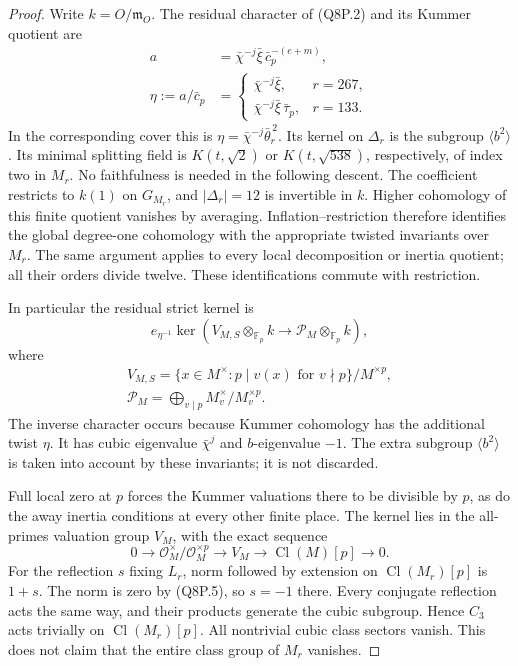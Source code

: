\begin{proof}
Write $k=O/\mathfrak m_O$.
The residual character of (Q8P.2) and its Kummer quotient are
\[
 \begin{aligned}
 a&=\bar\chi^{-j}\bar\xi\,\bar c_p^{-(e+m)},\\
 \eta:=a/\bar c_p&=
 \begin{cases}
 \bar\chi^{-j}\bar\xi,&r=267,\\
 \bar\chi^{-j}\bar\xi\,\bar\tau_p,&r=133.
 \end{cases}
 \end{aligned}
 \tag{Q8P.7}
\]
In the corresponding cover this is
$\eta=\bar\chi^{-j}\bar\theta_r^{\,2}$.
Its kernel on $\Delta_r$ is the subgroup $\langle b^2\rangle$.
Its minimal splitting field is $K(t,\sqrt2)$ or $K(t,\sqrt{538})$,
respectively, of index two in $M_r$.
No faithfulness is needed in the following descent.
The coefficient restricts to $k(1)$ on $G_{M_r}$, and
$|\Delta_r|=12$ is invertible in $k$.
Higher cohomology of this finite quotient vanishes by averaging.
Inflation--restriction therefore identifies the global degree-one
cohomology with the appropriate twisted invariants over $M_r$.
The same argument applies to every local decomposition or inertia
quotient; all their orders divide twelve.
These identifications commute with restriction.

In particular the residual strict kernel is
\[
 e_{\eta^{-1}}\ker\left(
 V_{M,S}\otimes_{\mathbb F_p}k
       \longrightarrow\mathcal P_M\otimes_{\mathbb F_p}k\right),
 \tag{Q8P.8}
\]
where
\[
 \begin{gathered}
 V_{M,S}=\{x\in M^\times:p\mid v(x)\text{ for }v\nmid p\}/M^{\times p},\\
 \mathcal P_M=\bigoplus_{v\mid p}M_v^\times/M_v^{\times p}.
 \end{gathered}
 \tag{Q8P.9}
\]
The inverse character occurs because Kummer cohomology has the
additional twist $\eta$.
It has cubic eigenvalue $\bar\chi^j$ and $b$-eigenvalue $-1$.
The extra subgroup $\langle b^2\rangle$ is taken into account
by these invariants; it is not discarded.

Full local zero at $p$ forces the Kummer valuations there to
be divisible by $p$, as do the away inertia conditions at
every other finite place.
The kernel lies in the all-primes valuation group $V_M$, with
the exact sequence
\[
 0\longrightarrow\mathcal O_M^\times/\mathcal O_M^{\times p}
 \longrightarrow V_M\longrightarrow\operatorname{Cl}(M)[p]
 \longrightarrow0.
 \tag{Q8P.10}
\]
For the reflection $s$ fixing $L_r$, norm followed by extension
on $\operatorname{Cl}(M_r)[p]$ is $1+s$.
The norm is zero by (Q8P.5), so $s=-1$ there.
Every conjugate reflection acts the same way, and their products
generate the cubic subgroup.
Hence $C_3$ acts trivially on $\operatorname{Cl}(M_r)[p]$.
All nontrivial cubic class sectors vanish.
This does not claim that the entire class group of $M_r$ vanishes.


\end{proof}
